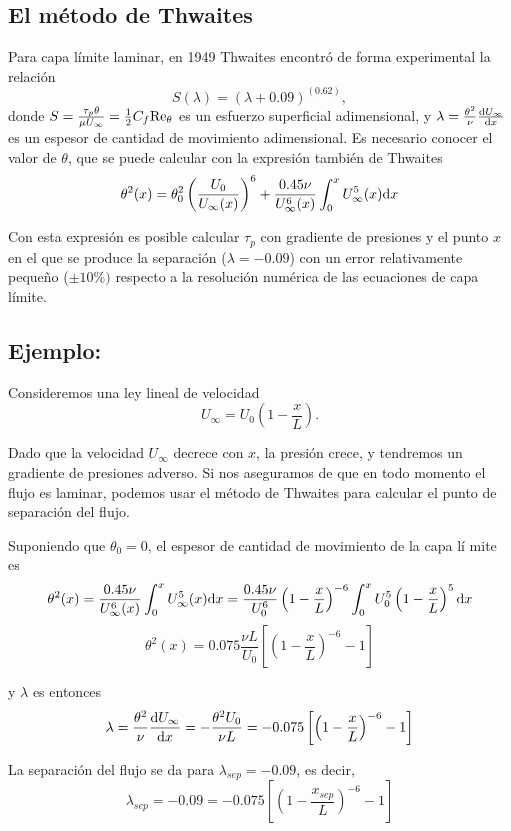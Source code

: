 \subsection{El método de Thwaites}
	
	Para capa límite laminar, en 1949 Thwaites encontró de forma experimental
	la relación 
	\[
	S(\lambda)=(\lambda+0.09)^{(0.62)},
	\]
	donde $S=\frac{\tau_{p}\theta}{\mu U_{\infty}}=\frac{1}{2}C_{f}\text{Re}_{\theta}$
	es un esfuerzo superficial adimensional, y $\lambda=\frac{\theta^{2}}{\nu}\frac{\textrm{d} U_{\infty}}{\textrm{d} x}$
	es un espesor de cantidad de movimiento adimensional. Es necesario
	conocer el valor de $\theta$, que se puede calcular con la expresión
	también de Thwaites 
	\[
	\theta^{2}(x)=\theta_{0}^{2}\left(\frac{U_{0}}{U_{\infty}(x)}\right)^{6}+\frac{0.45\nu}{U_{\infty}^{6}(x)}\int_{0}^{x}U_{\infty}^{5}(x)\text{d} x
	\]
	
	Con esta expresión es posible calcular $\tau_{p}$ con gradiente de
	presiones y el punto $x$ en el que se produce la separación ($\lambda=-0.09$)
	con un error relativamente pequeño ($\pm10\%)$ respecto a la resolución
	numérica de las ecuaciones de capa límite.

	
	\subsection*{Ejemplo:}
		Consideremos una ley lineal de velocidad 
		\[
		U_{\infty}=U_{0}\left(1-\frac{x}{L}\right).
		\]
		
		Dado que la velocidad $U_{\infty}$ decrece con $x$, la presión crece,
		y tendremos un gradiente de presiones adverso. Si nos aseguramos de
		que en todo momento el flujo es laminar, podemos usar el método de
		Thwaites para calcular el punto de separación del flujo.
		
		Suponiendo que $\theta_{0}=0$, el espesor de cantidad de movimiento
		de la capa lí mite es {\footnotesize{}
			\[
			\theta^{2}(x)=\frac{0.45\nu}{U_{\infty}^{6}(x)}\int_{0}^{x}U_{\infty}^{5}(x)\text{d} x=\frac{0.45\nu}{U_{0}^{6}}\left(1-\frac{x}{L}\right)^{-6}\int_{0}^{x}U_{0}^{5}\left(1-\frac{x}{L}\right)^{5}\text{d} x
			\]
		} 
		\[
		\theta^{2}(x)=0.075\frac{\nu L}{U_{0}}\left[\left(1-\frac{x}{L}\right)^{-6}-1\right]
		\]
		
		y $\lambda$ es entonces 
		\[
		\lambda=\frac{\theta^{2}}{\nu}\frac{\textrm{d} U_{\infty}}{\textrm{d} x}=-\frac{\theta^{2}U_{0}}{\nu L}=-0.075\left[\left(1-\frac{x}{L}\right)^{-6}-1\right]
		\]
		
		La separación del flujo se da para $\lambda_{sep}=-0.09$, es decir,
		\[
		\lambda_{sep}=-0.09=-0.075\left[\left(1-\frac{x_{sep}}{L}\right)^{-6}-1\right]
		\]
		
